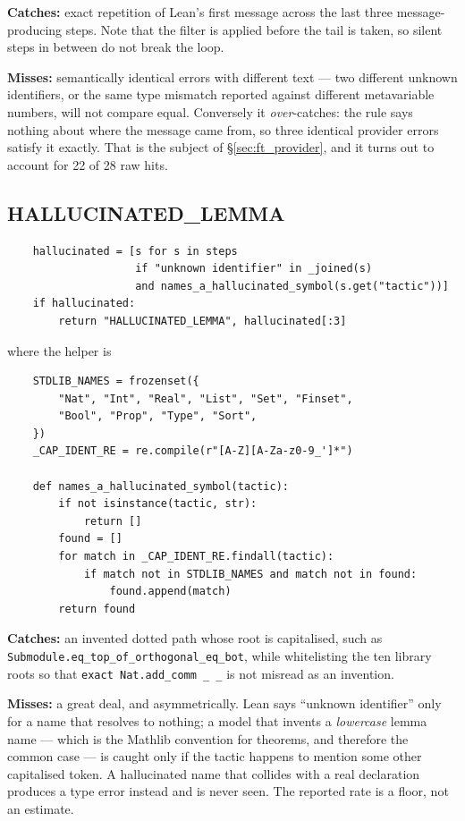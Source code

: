 \noindent
\textbf{Catches:} exact repetition of Lean's first message across the last
three message-producing steps. Note that the filter is applied before the tail
is taken, so silent steps in between do not break the loop.

\noindent
\textbf{Misses:} semantically identical errors with different text --- two
different unknown identifiers, or the same type mismatch reported against
different metavariable numbers, will not compare equal. Conversely it
\emph{over}-catches: the rule says nothing about where the message came from,
so three identical provider errors satisfy it exactly. That is the subject of
\S\ref{sec:ft_provider}, and it turns out to account for 22 of 28 raw hits.

\subsection{HALLUCINATED\_LEMMA}

\begin{verbatim}
    hallucinated = [s for s in steps
                    if "unknown identifier" in _joined(s)
                    and names_a_hallucinated_symbol(s.get("tactic"))]
    if hallucinated:
        return "HALLUCINATED_LEMMA", hallucinated[:3]
\end{verbatim}

\noindent where the helper is

\begin{verbatim}
    STDLIB_NAMES = frozenset({
        "Nat", "Int", "Real", "List", "Set", "Finset",
        "Bool", "Prop", "Type", "Sort",
    })
    _CAP_IDENT_RE = re.compile(r"[A-Z][A-Za-z0-9_']*")

    def names_a_hallucinated_symbol(tactic):
        if not isinstance(tactic, str):
            return []
        found = []
        for match in _CAP_IDENT_RE.findall(tactic):
            if match not in STDLIB_NAMES and match not in found:
                found.append(match)
        return found
\end{verbatim}

\noindent
\textbf{Catches:} an invented dotted path whose root is capitalised, such as
\texttt{Submodule.eq\_top\_of\_orthogonal\_eq\_bot}, while whitelisting the ten
library roots so that \texttt{exact Nat.add\_comm \_ \_} is not misread as an
invention.

\noindent
\textbf{Misses:} a great deal, and asymmetrically. Lean says ``unknown
identifier'' only for a name that resolves to nothing; a model that invents a
\emph{lowercase} lemma name --- which is the Mathlib convention for theorems,
and therefore the common case --- is caught only if the tactic happens to
mention some other capitalised token. A hallucinated name that collides with a
real declaration produces a type error instead and is never seen. The reported
rate is a floor, not an estimate.

